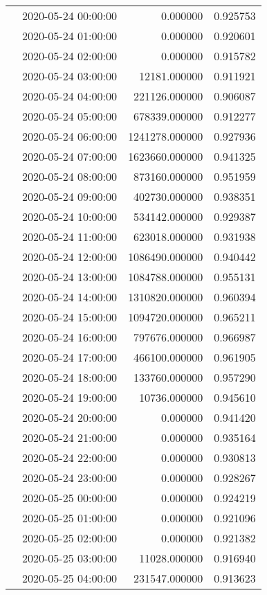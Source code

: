 \begin{tabular}{llrr}
 & 2020-05-24 00:00:00 & 0.000000 & 0.925753 \\
 & 2020-05-24 01:00:00 & 0.000000 & 0.920601 \\
 & 2020-05-24 02:00:00 & 0.000000 & 0.915782 \\
 & 2020-05-24 03:00:00 & 12181.000000 & 0.911921 \\
 & 2020-05-24 04:00:00 & 221126.000000 & 0.906087 \\
 & 2020-05-24 05:00:00 & 678339.000000 & 0.912277 \\
 & 2020-05-24 06:00:00 & 1241278.000000 & 0.927936 \\
 & 2020-05-24 07:00:00 & 1623660.000000 & 0.941325 \\
 & 2020-05-24 08:00:00 & 873160.000000 & 0.951959 \\
 & 2020-05-24 09:00:00 & 402730.000000 & 0.938351 \\
 & 2020-05-24 10:00:00 & 534142.000000 & 0.929387 \\
 & 2020-05-24 11:00:00 & 623018.000000 & 0.931938 \\
 & 2020-05-24 12:00:00 & 1086490.000000 & 0.940442 \\
 & 2020-05-24 13:00:00 & 1084788.000000 & 0.955131 \\
 & 2020-05-24 14:00:00 & 1310820.000000 & 0.960394 \\
 & 2020-05-24 15:00:00 & 1094720.000000 & 0.965211 \\
 & 2020-05-24 16:00:00 & 797676.000000 & 0.966987 \\
 & 2020-05-24 17:00:00 & 466100.000000 & 0.961905 \\
 & 2020-05-24 18:00:00 & 133760.000000 & 0.957290 \\
 & 2020-05-24 19:00:00 & 10736.000000 & 0.945610 \\
 & 2020-05-24 20:00:00 & 0.000000 & 0.941420 \\
 & 2020-05-24 21:00:00 & 0.000000 & 0.935164 \\
 & 2020-05-24 22:00:00 & 0.000000 & 0.930813 \\
 & 2020-05-24 23:00:00 & 0.000000 & 0.928267 \\
 & 2020-05-25 00:00:00 & 0.000000 & 0.924219 \\
 & 2020-05-25 01:00:00 & 0.000000 & 0.921096 \\
 & 2020-05-25 02:00:00 & 0.000000 & 0.921382 \\
 & 2020-05-25 03:00:00 & 11028.000000 & 0.916940 \\
 & 2020-05-25 04:00:00 & 231547.000000 & 0.913623 \\

\end{tabular}
